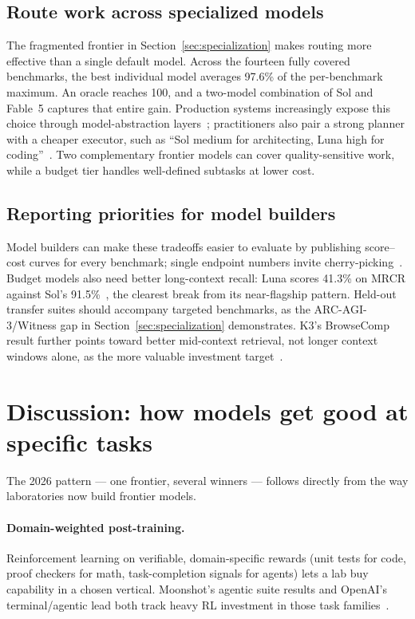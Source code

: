 \documentclass[11pt]{article}
\begin{document}
\subsection{Route work across specialized models}\label{sec:routing}

The fragmented frontier in Section~\ref{sec:specialization} makes routing more
effective than a single default model. Across the fourteen fully covered
benchmarks, the best individual model averages 97.6\% of the per-benchmark
maximum. An oracle reaches 100, and a two-model combination of Sol and Fable~5
captures that entire gain. Production systems increasingly expose this choice
through model-abstraction layers~\cite{explainx2026gpt56}; practitioners also
pair a strong planner with a cheaper executor, such as ``Sol medium for
architecting, Luna high for coding''~\cite{hn2026gpt56}. Two complementary
frontier models can cover quality-sensitive work, while a budget tier handles
well-defined subtasks at lower cost.

\subsection{Reporting priorities for model builders}\label{sec:labs}
Model builders can make these tradeoffs easier to evaluate by publishing
score--cost curves for every benchmark; single endpoint numbers invite
cherry-picking~\cite{anthropic2026opus5}. Budget models also need better
long-context recall: Luna scores 41.3\% on MRCR against Sol's
91.5\%~\cite{openai2026gpt56}, the clearest break from its near-flagship
pattern. Held-out transfer suites should accompany targeted benchmarks, as the
ARC-AGI-3/Witness gap in Section~\ref{sec:specialization} demonstrates.
K3's BrowseComp result further points toward better mid-context retrieval, not
longer context windows alone, as the more valuable investment
target~\cite{moonshot2026k3}.

\section{Discussion: how models get good at specific tasks}\label{sec:discussion}

The 2026 pattern --- one frontier, several winners --- follows directly
from the way laboratories now build frontier models.

\paragraph{Domain-weighted post-training.} Reinforcement learning on
verifiable, domain-specific rewards (unit tests for code, proof checkers for
math, task-completion signals for agents) lets a lab buy capability in a chosen
vertical. Moonshot's agentic suite results and OpenAI's terminal/agentic lead
both track heavy RL investment in those task
families~\cite{moonshot2026k3,openai2026gpt56}.
\end{document}

